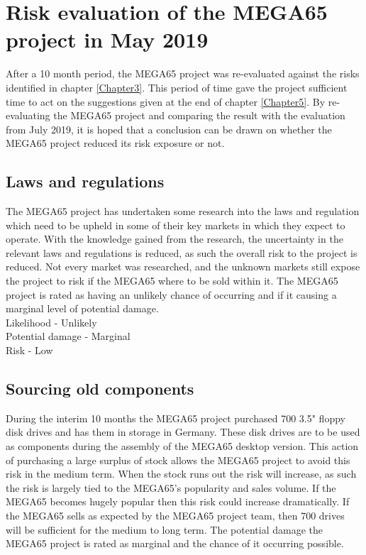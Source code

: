 
\chapter{Risk evaluation of the MEGA65 project in May 2019}
\label{Chapter6}
After a 10 month period, the MEGA65 project was re-evaluated against the risks identified in chapter \ref{Chapter3}. This period of time gave the project sufficient time to act on the suggestions given at the end of chapter \ref{Chapter5}. By re-evaluating the MEGA65 project and comparing the result with the evaluation from July 2019, it is hoped that a conclusion can be drawn on whether the MEGA65 project reduced its risk exposure or not. 

\section{Laws and regulations}
The MEGA65 project has undertaken some research into the laws and regulation which need to be upheld in some of their key markets in which they expect to operate. With the knowledge gained from the research, the uncertainty in the relevant laws and regulations is reduced, as such the overall risk to the project is reduced. Not every market was researched, and the unknown markets still expose the project to risk if the MEGA65 where to be sold within it. The MEGA65 project is rated as having an unlikely chance of occurring and if it causing a marginal level of potential damage. \\

Likelihood - Unlikely \\
Potential damage - Marginal \\
Risk - Low \\


\section{Sourcing old components}
During the interim 10 months the MEGA65 project purchased 700 3.5" floppy disk drives and has them in storage in Germany. These disk drives are to be used as components during the assembly of the MEGA65 desktop version. This action of purchasing a large surplus of stock allows the MEGA65 project to avoid this risk in the medium term. When the stock runs out the risk will increase, as such the risk is largely tied to the MEGA65's popularity and sales volume. If the MEGA65 becomes hugely popular then this risk could increase dramatically. If the MEGA65 sells as expected by the MEGA65 project team, then 700 drives will be sufficient for the medium to long term. The potential damage the MEGA65 project is rated as marginal and the chance of it occurring possible. \\

